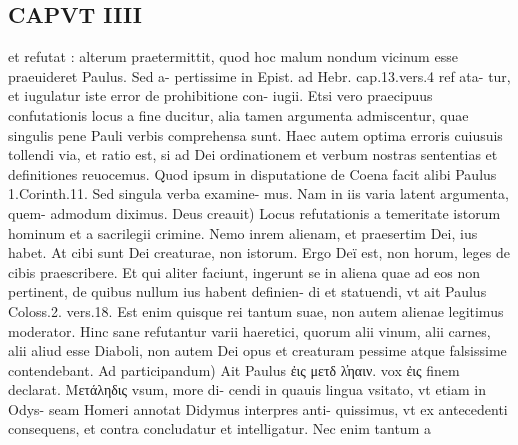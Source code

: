 \documentclass{article}
\begin{document}
\begin{pages}
\section*{CAPVT IIII }
\marginpar{[ p.187 ]}\pstart et refutat : alterum praetermittit, quod hoc malum nondum vicinum esse praeuideret Paulus. Sed a- pertissime in Epist. ad Hebr. cap.13.vers.4 ref ata- tur, et iugulatur iste error de prohibitione con- iugii. Etsi vero praecipuus confutationis locus a fine ducitur, alia tamen argumenta admiscentur, quae singulis pene Pauli verbis comprehensa sunt. Haec autem optima erroris cuiusuis tollendi via, et ratio est, si ad Dei ordinationem et verbum nostras sententias et definitiones reuocemus. Quod ipsum in disputatione de Coena facit alibi Paulus 1.Corinth.11. Sed singula verba examine- mus. Nam in iis varia latent argumenta, quem- admodum diximus. Deus creauit) Locus refutationis a temeritate istorum hominum et a sacrilegii crimine. Nemo inrem alienam, et praesertim Dei, ius habet. At cibi sunt Dei creaturae, non istorum. Ergo Deï est, non horum, leges de cibis praescribere. Et qui aliter faciunt, ingerunt se in aliena quae ad eos non pertinent, de quibus nullum ius habent definien- di et statuendi, vt ait Paulus Coloss.2. vers.18. Est enim quisque rei tantum suae, non autem alienae legitimus moderator. Hinc sane refutantur varii haeretici, quorum alii vinum, alii carnes, alii aliud esse Diaboli, non autem Dei opus et creaturam pessime atque falsissime contendebant. Ad participandum) Ait Paulus ἐις μετδ λ̓ηαιν. vox ἐις finem declarat. Μετάληδις vsum, more di- cendi in quauis lingua vsitato, vt etiam in Odys- seam Homeri annotat Didymus interpres anti- quissimus, vt ex antecedenti consequens, et contra concludatur et intelligatur. Nec enim tantum a  \pend

\end{pages}
\end{document}
